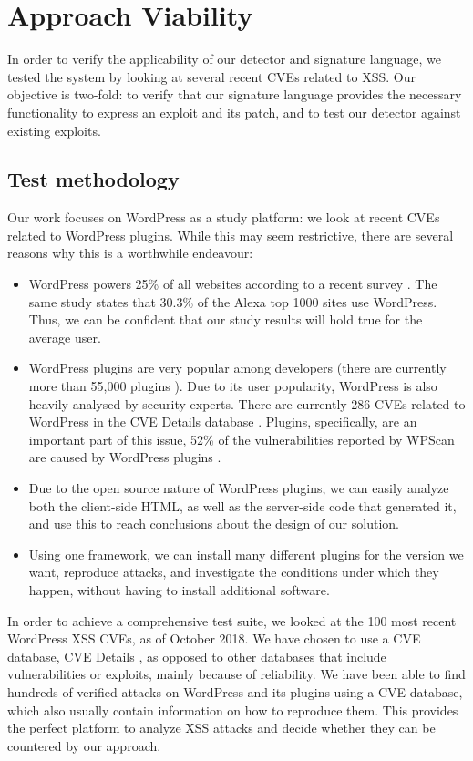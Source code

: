 \section{Approach Viability}

In order to verify the applicability of our detector and signature language, we tested the system by looking at several recent CVEs related to \ac{XSS}. Our objective is two-fold: to verify that our signature language provides the necessary functionality to express an exploit and its patch, and to test our detector against existing exploits.

\subsection{Test methodology}

Our work focuses on WordPress as a study platform: we look at recent CVEs related to WordPress plugins. While this may seem restrictive, there are several reasons why this is a worthwhile endeavour:
\begin{itemize}
	\item WordPress powers 25\% of all websites according to a recent survey  \cite{w3techs}. The same study states that 30.3\% of the Alexa top 1000 sites use WordPress. Thus, we can be confident that our study results will hold true for the average user.
	\item WordPress plugins are very popular among developers (there are currently more than 55,000 plugins \cite{wpplugins}). Due to its user popularity, WordPress is also heavily analysed by security experts. There are currently 286 CVEs related to WordPress in the CVE Details database \cite{cvedetails}. Plugins, specifically, are an important part of this issue, 52\% of the vulnerabilities reported by WPScan are caused by WordPress plugins \cite{wpscan}.
	\item Due to the open source nature of WordPress plugins, we can easily analyze both the client-side HTML, as well as the server-side code that generated it, and use this to reach conclusions about the design of our solution.
	\item Using one framework, we can install many different plugins for the version we want, reproduce attacks, and investigate the conditions under which they happen, without having to install additional software.
\end{itemize}

In order to achieve a comprehensive test suite, we looked at the 100 most recent WordPress \ac{XSS} CVEs, as of October 2018. We have chosen to use a CVE database, CVE Details \cite{cvedetails}, as opposed to other databases that include vulnerabilities or exploits, mainly because of reliability. We have been able to find hundreds of verified attacks on WordPress and its plugins using a CVE database, which also usually contain information on how to reproduce them. This provides the perfect platform to analyze \ac{XSS} attacks and decide whether they can be countered by our approach. 

